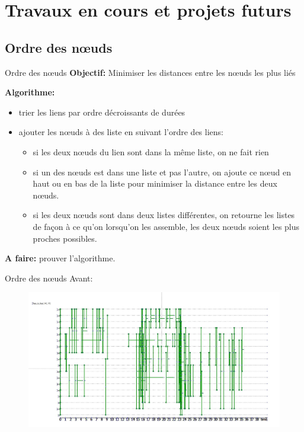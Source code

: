 \documentclass[15pt]{beamer}
\begin{document}
\section{Travaux en cours et projets futurs}
\subsection{Ordre des n\oe{}uds}
\begin{frame}{Ordre des n\oe{}uds}
    \textbf{Objectif:} Minimiser les distances entre les n\oe{}uds les plus \og liés \fg{}
    
    
    \textbf{Algorithme:} \begin{itemize}
        \item trier les liens par ordre décroissants de durées
        \item ajouter les n\oe{}uds à des liste en suivant l'ordre des liens: 
        \begin{itemize}
            \item si les deux n\oe{}uds du lien sont dans la même liste, on ne fait rien
            \item si un des n\oe{}uds est dans une liste et pas l'autre, on ajoute ce n\oe{}ud en haut ou en bas de la liste pour minimiser la distance entre les deux n\oe{}uds.
            \item si les deux n\oe{}uds sont dans deux listes différentes, on retourne les listes de façon à ce qu'on lorsqu'on les assemble, les deux n\oe{}uds soient les plus proches possibles.
        \end{itemize}
    \end{itemize}
    
    \textbf{A faire:} prouver l'algorithme.
\end{frame}

\begin{frame}{Ordre des n\oe{}uds}
    Avant:
    
    \begin{figure}
        \centering
        \includegraphics[width=\textwidth]{img/nonordonne.JPG}
        \label{fig:my_label}
    \end{figure}
\end{frame}
\end{document}

